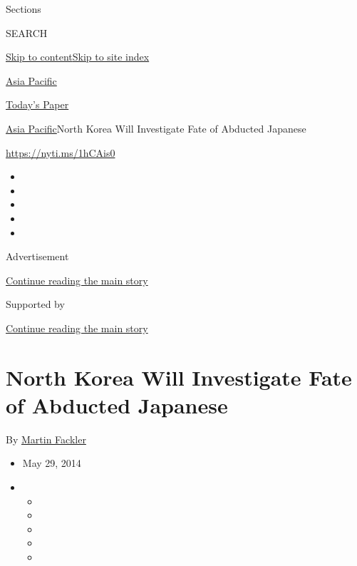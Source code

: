 Sections

SEARCH

\protect\hyperlink{site-content}{Skip to
content}\protect\hyperlink{site-index}{Skip to site index}

\href{https://www.nytimes3xbfgragh.onion/section/world/asia}{Asia
Pacific}

\href{https://myaccount.nytimes3xbfgragh.onion/auth/login?response_type=cookie\&client_id=vi}{}

\href{https://www.nytimes3xbfgragh.onion/section/todayspaper}{Today's
Paper}

\href{/section/world/asia}{Asia Pacific}\textbar{}North Korea Will
Investigate Fate of Abducted Japanese

\url{https://nyti.ms/1hCAis0}

\begin{itemize}
\item
\item
\item
\item
\item
\end{itemize}

Advertisement

\protect\hyperlink{after-top}{Continue reading the main story}

Supported by

\protect\hyperlink{after-sponsor}{Continue reading the main story}

\hypertarget{north-korea-will-investigate-fate-of-abducted-japanese}{%
\section{North Korea Will Investigate Fate of Abducted
Japanese}\label{north-korea-will-investigate-fate-of-abducted-japanese}}

By \href{http://www.nytimes3xbfgragh.onion/by/martin-fackler}{Martin
Fackler}

\begin{itemize}
\item
  May 29, 2014
\item
  \begin{itemize}
  \item
  \item
  \item
  \item
  \item
  \end{itemize}
\end{itemize}


